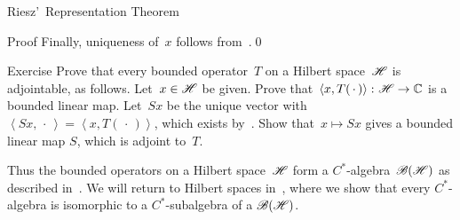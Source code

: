\documentclass[a]{subfiles}
\begin{document}
\begin{parsec}
\begin{point}{Riesz'~Representation Theorem}
\begin{point}{Proof}
Finally, uniqueness of~$x$ follows from~.\qed
\end{point}
\end{point}
\begin{point}{Exercise}%
Prove that every bounded operator~$T$ on a Hilbert space~$\mathscr{H}$
is adjointable, as follows.
Let~$x\in \mathscr{H}$ be given.
Prove that~$\left<x,T(\,\cdot\,)\right>\colon \mathscr{H}\to \mathbb{C}$
is a bounded linear map.
Let~$Sx$ be the unique vector with $\left<Sx,\,\cdot\,\right>
=\left<x,T(\,\cdot\,)\right>$,
which exists by~.
Show that~$x\mapsto Sx$
gives a bounded linear map $S$, which is adjoint to~$T$.
\end{point}
\begin{point}%
Thus the bounded operators
on a Hilbert space~$\mathscr{H}$
form a $C^*$-algebra~$\mathscr{B}(\mathscr{H})$
as described in~.
We will return to Hilbert spaces
in~,
where we show that every $C^*$-algebra
is isomorphic to a $C^*$-subalgebra of
a $\mathscr{B}(\mathscr{H})$.
\end{point}
\end{parsec}
\end{document}

